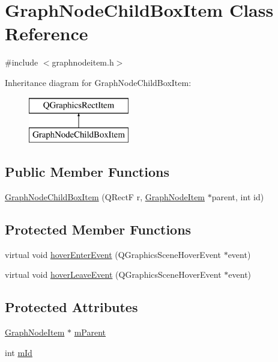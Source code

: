 \hypertarget{class_graph_node_child_box_item}{}\section{Graph\+Node\+Child\+Box\+Item Class Reference}
\label{class_graph_node_child_box_item}


{\ttfamily \#include $<$graphnodeitem.\+h$>$}

Inheritance diagram for Graph\+Node\+Child\+Box\+Item\+:\begin{figure}[H]
\begin{center}
\leavevmode
\includegraphics[height=2.000000cm]{d6/d73/class_graph_node_child_box_item}
\end{center}
\end{figure}
\subsection*{Public Member Functions}
\begin{DoxyCompactItemize}
\item 
\mbox{\hyperlink{class_graph_node_child_box_item_a7057ac6ca195d382d49d207b3528f59a}{Graph\+Node\+Child\+Box\+Item}} (Q\+RectF r, \mbox{\hyperlink{class_graph_node_item}{Graph\+Node\+Item}} $\ast$parent, int id)
\end{DoxyCompactItemize}
\subsection*{Protected Member Functions}
\begin{DoxyCompactItemize}
\item 
virtual void \mbox{\hyperlink{class_graph_node_child_box_item_a06a22cbe36ce6112f4580dc9ed03524e}{hover\+Enter\+Event}} (Q\+Graphics\+Scene\+Hover\+Event $\ast$event)
\item 
virtual void \mbox{\hyperlink{class_graph_node_child_box_item_a1dcc8d6951b22511a196e31383d0347a}{hover\+Leave\+Event}} (Q\+Graphics\+Scene\+Hover\+Event $\ast$event)
\end{DoxyCompactItemize}
\subsection*{Protected Attributes}
\begin{DoxyCompactItemize}
\item 
\mbox{\hyperlink{class_graph_node_item}{Graph\+Node\+Item}} $\ast$ \mbox{\hyperlink{class_graph_node_child_box_item_a64de6c151377525617d80e62eda698b2}{m\+Parent}}
\item 
int \mbox{\hyperlink{class_graph_node_child_box_item_a1e87196493d1bf8ba0f382a04e4242ec}{m\+Id}}
\end{DoxyCompactItemize}
